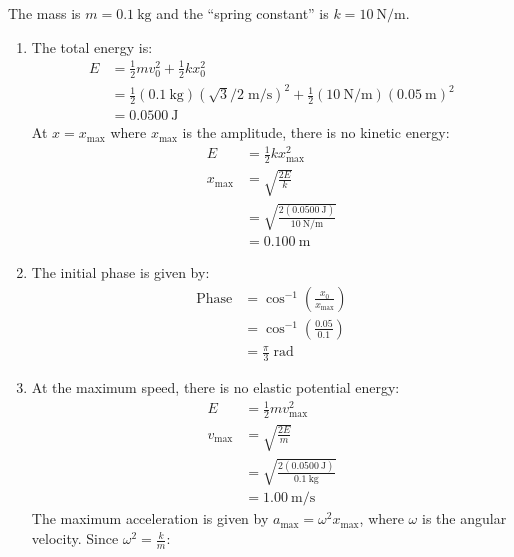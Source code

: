 \begin{solution}
    \begin{subsolution}
        The mass is $m=\qty{0.1}{\kg}$ and the ``spring constant'' is $k=\qty{10}{\N\per\m}$.
        \renewcommand{\theenumi}{(\alph{enumi})}
        \begin{enumerate}
            \item The total energy is:
            \begin{align*}
                E&=\frac{1}{2}mv_0^2+\frac{1}{2}kx_0^2\\
                &=\frac{1}{2}(\qty{0.1}{\kg})(\sqrt{3}/2\;\unit{\m\per\s})^2+\frac{1}{2}(\qty{10}{\N\per\m})(\qty{0.05}{\m})^2\\
                &=\qty{0.0500}{\J}
            \end{align*}
            At \(x=x_{\mathrm{max}}\) where $x_{\mathrm{max}}$ is the amplitude, there is no kinetic energy:
            \begin{align*}
                E&=\frac{1}{2}kx_{\mathrm{max}}^2\\
                x_{\mathrm{max}}&=\sqrt{\frac{2E}{k}}\\
                &=\sqrt{\frac{2(\qty{0.0500}{\J})}{\qty{10}{\N\per\m}}}\\
                &=\boxed{\qty{0.100}{\m}}
            \end{align*}
            \item The initial phase is given by:
            \begin{align*}
                \text{Phase}&=\cos^{-1}\left(\frac{x_0}{x_{\mathrm{max}}}\right)\\
                &=\cos^{-1}\left(\frac{0.05}{0.1}\right)\\
                &=\boxed{\frac{\pi}{3}\;\unit{\radian}}
            \end{align*}
            \item At the maximum speed, there is no elastic potential energy:
            \begin{align*}
                E&=\frac{1}{2}mv_{\mathrm{max}}^2\\
                v_{\mathrm{max}}&=\sqrt{\frac{2E}{m}}\\
                &=\sqrt{\frac{2(\qty{0.0500}{\J})}{\qty{0.1}{\kg}}}\\
                &=\boxed{\qty{1.00}{\m\per\s}}
            \end{align*}
            The maximum acceleration is given by \(a_{\mathrm{max}}=\omega^2x_{\mathrm{max}}\), where $\omega$ is the angular velocity. Since \(\omega^2=\frac{k}{m}\):

\end{enumerate}
\end{subsolution}
\end{solution}

